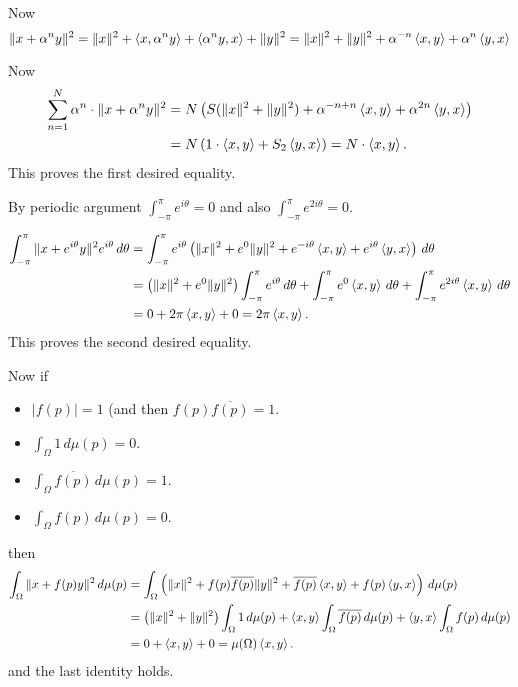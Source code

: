 \begin{enumerate}
Now
\begin{equation*}
 \|x + \alpha^n y\|^2
   = \|x\|^2 + \left\langle x, \alpha^n y \right\rangle + \left\langle \alpha^n y, x \right\rangle + \|y\|^2
   = \|x\|^2 + \|y\|^2 + \alpha^{-n}\left\langle x, y \right\rangle + \alpha^n \left\langle y, x \right\rangle 
\end{equation*}

Now
\begin{align*}
\sum_{n=1}^N \alpha^n \cdot \|x + \alpha^n y\|^2 
 &= N\left(S(\|x\|^2 + \|y\|^2)
    + \alpha^{-n+n}\left\langle x, y \right\rangle + \alpha^{2n} \left\langle y, x \right\rangle\right) \\
 &= N\left( 1\cdot \left\langle x, y \right\rangle + S_2\left\langle y, x \right\rangle\right)
    = N\cdot \left\langle x, y \right\rangle.
\end{align*}
This proves the first desired equality.

By periodic argument \(\int_{-\pi}^\pi e^{i\theta} = 0\)
and also \(\int_{-\pi}^\pi e^{2i\theta} = 0\).

\begin{align*}
\int_{-\pi}^\pi \|x + e^{i\theta} y\|^2 e^{i\theta}\,d\theta
 &= \int_{-\pi}^\pi e^{i\theta}\left(\|x\|^2 + e^0\|y\|^2 +
     e^{-i\theta}\left\langle x, y \right\rangle + e^{i\theta}\left\langle y, x \right\rangle\right) \,d\theta \\
 &= \left(\|x\|^2 + e^0\|y\|^2 \right)\int_{-\pi}^\pi e^{i\theta}\,d\theta
    + \int_{-\pi}^\pi e^0\left\langle x, y \right\rangle\,d\theta
    + \int_{-\pi}^\pi e^{2i\theta}\left\langle x, y \right\rangle\,d\theta \\
 &= 0 + 2\pi \left\langle x, y \right\rangle + 0 =  2\pi \left\langle x, y \right\rangle.
\end{align*}
This proves the second desired equality.

Now if
\begin{itemize}
\item \(|f(p)| = 1\) (and then \(f(p)\overline{f(p)}=1\).
\item \(\int_\Omega 1\,d\mu(p) = 0\).
\item \(\int_\Omega \overline{f(p)}\,d\mu(p) = 1\).
\item \(\int_\Omega f(p)\,d\mu(p) = 0\).
\end{itemize}
then
\begin{align*}
\int_\Omega \|x + f(p)y\|^2 \,d\mu(p)
 &= \int_\Omega \left(\|x\|^2 + f(p)\overline{f(p)}\|y\|^2
   + \overline{f(p)}\left\langle x, y \right\rangle
   + f(p)\left\langle y, x \right\rangle\right)\,d\mu(p) \\
 &= \left(\|x\|^2 + \|y\|^2\right)\int_\Omega 1\,d\mu(p)
    + \left\langle x, y \right\rangle\int_\Omega \overline{f(p)}\,d\mu(p)
    + \left\langle y, x \right\rangle\int_\Omega f(p)\,d\mu(p) \\
 &= 0 + \left\langle x, y \right\rangle + 0 = \mu(\Omega)\left\langle x, y \right\rangle.
\end{align*}
and the last identity holds.


\end{enumerate}
